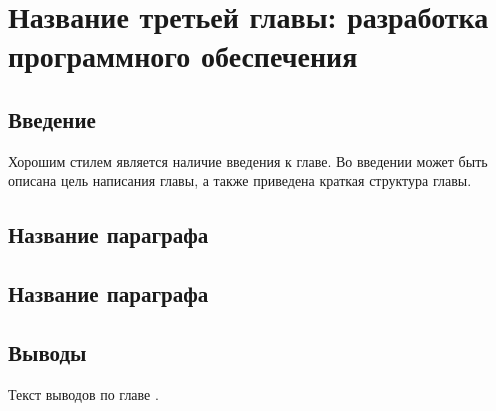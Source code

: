 \chapter{Название третьей главы: разработка программного обеспечения} \label{ch3}

\section{Введение} \label{ch3:intro}

Хорошим стилем является наличие введения к главе. Во введении может быть описана цель написания главы, а также приведена краткая структура главы. 
	
\section{Название параграфа} \label{ch3:sec1}

\section{Название параграфа} \label{ch3:sec2}



\section{Выводы} \label{ch3:conclusion}

Текст выводов по главе \thechapter.


%
